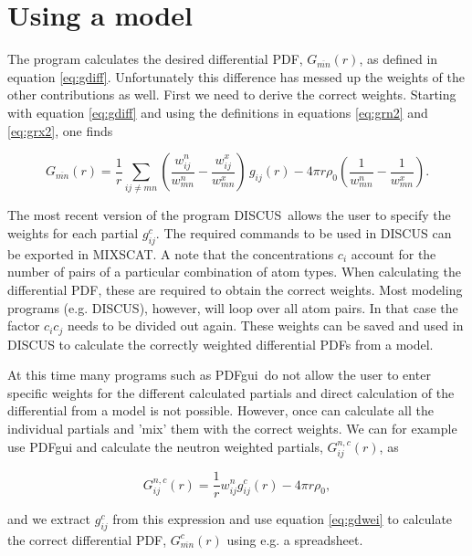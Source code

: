 \section{Using a model \label{app-mod}}

The program calculates the desired differential PDF,
$G_{\overline{mn}}(r)$, as defined in equation \ref{eq:gdiff}.
Unfortunately this difference has messed up the weights of the other
contributions as well. First we need to derive the correct weights. 
Starting with equation \ref{eq:gdiff} and using the definitions in 
equations \ref{eq:grn2} and \ref{eq:grx2}, one finds

\begin{equation}
  G_{\overline{mn}}(r) = \frac{1}{r} \sum_{ij \neq mn} \left (
                         \frac{w^{n}_{ij}}{w^{n}_{mn}} -
                         \frac{w^{x}_{ij}}{w^{x}_{mn}} \right ) \,g_{ij}(r) -
                         4 \pi r \rho_{0} \left ( \frac{1}{w^{n}_{mn}} -
                                                  \frac{1}{w^{x}_{mn}} \right ).
  \label{eq:gdwei}
\end{equation}

The most recent version of the program DISCUS\,\citep{discus} allows the 
user to specify the weights for
each partial $g^{c}_{ij}$. The required commands to be used in
DISCUS can be exported in MIXSCAT. A note that the concentrations
$c_i$ account for the number of pairs of a particular combination
of atom types. When calculating the differential PDF, these are required
to obtain the correct weights. Most modeling programs (e.g. DISCUS),
however, will loop over all atom pairs. In that case the factor 
$c_i c_j$ needs to be divided out again.
These weights can be saved and used in DISCUS to calculate the correctly
weighted differential PDFs from a model.

At this time many programs such as PDFgui\,\citep{pdfgui} do not allow 
the user to enter specific weights for the different calculated partials 
and direct calculation of the differential from a model is not possible. However, once can calculate all the individual partials and 'mix' them with the correct weights. We can for example use PDFgui and calculate the neutron weighted partials, $G^{n,c}_{ij}(r)$, as

\begin{equation}
  G^{n,c}_{ij}(r) = \frac{1}{r} w^{n}_{ij} g^{c}_{ij}(r) - 4 \pi r \rho_{0},
  \label{eq:gcn}
\end{equation}

and we extract $g^{c}_{ij}$ from this expression and use equation 
\ref{eq:gdwei} to calculate the correct differential PDF, $G^{c}_{\overline{mn}}(r)$ using e.g. a spreadsheet. 

